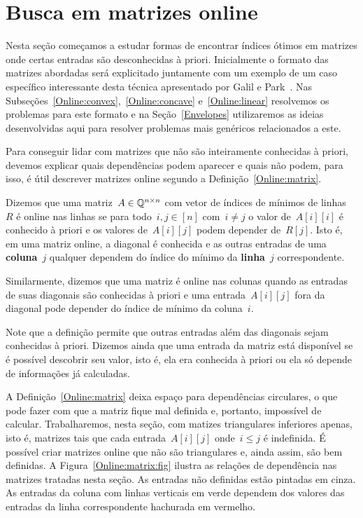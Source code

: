 \section{Busca em matrizes online}
\label{Online}

Nesta seção começamos a estudar formas de encontrar índices ótimos em matrizes onde certas entradas são desconhecidas à priori. Inicialmente o formato das matrizes abordadas será explicitado juntamente com um exemplo de um caso específico interessante desta técnica apresentado por Galil e Park~\cite{Galil:1992}. Nas Subseções~\ref{Online:convex},~\ref{Online:concave} e~\ref{Online:linear} resolvemos os problemas para este formato e na Seção~\ref{Envelopes} utilizaremos as ideias desenvolvidas aqui para resolver problemas mais genéricos relacionados a este.

Para conseguir lidar com matrizes que não são inteiramente conhecidas à priori, devemos explicar quais dependências podem aparecer e quais não podem, para isso, é útil descrever matrizes online segundo a Definição~\ref{Online:matrix}.

\begin{defi} \label{Online:matrix}
Dizemos que uma matriz~$A \in \mathbb{Q}^{n \times n}$ com vetor de índices de mínimos de linhas~$R$ é online nas linhas se para todo~$i,j \in [n]$ com~$i \neq j$ o valor de~$A[i][i]$ é conhecido à priori e os valores de~$A[i][j]$ podem depender de~$R[j]$. Isto é, em uma matriz online, a diagonal é conhecida e as outras entradas de uma \textbf{coluna}~$j$ qualquer dependem do índice do mínimo da \textbf{linha}~$j$ correspondente.

Similarmente, dizemos que uma matriz é online nas colunas quando as entradas de suas diagonais são conhecidas à priori e uma entrada~$A[i][j]$ fora da diagonal pode depender do índice de mínimo da coluna~$i$.
\end{defi}

Note que a definição permite que outras entradas além das diagonais sejam conhecidas à priori. Dizemos ainda que uma entrada da matriz está disponível se é possível descobrir seu valor, isto é, ela era conhecida à priori ou ela só depende de informações já calculadas. 

A Definição~\ref{Online:matrix} deixa espaço para dependências circulares, o que pode fazer com que a matriz fique mal definida e, portanto, impossível de calcular. Trabalharemos, nesta seção, com matizes triangulares inferiores apenas, isto é, matrizes tais que cada entrada~$A[i][j]$ onde~$i \leq j$ é indefinida. É possível criar matrizes online que não são triangulares e, ainda assim, são bem definidas. A Figura~\ref{Online:matrix:fig} ilustra as relações de dependência nas matrizes tratadas nesta seção. As entradas não definidas estão pintadas em cinza. As entradas da coluna com linhas verticais em verde dependem dos valores das entradas da linha correspondente hachurada em vermelho. 

